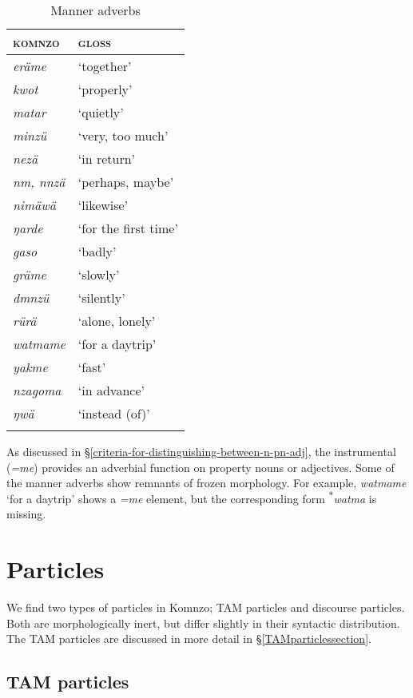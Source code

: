 \begin{table}
\caption{Manner adverbs}
\label{manner-adverbs}
	\begin{tabular}{ll}
		\lsptoprule
		\textsc{komnzo}&\textsc{gloss}\\\midrule
		\emph{eräme}&`together'\\
		\emph{kwot}&`properly'\\
		\emph{matar}&`quietly'\\
		\emph{minzü}&`very, too much'\\
		\emph{nezä}&`in return'\\
		\emph{nm, nnzä}&`perhaps, maybe'\\
		\emph{nimäwä}&`likewise'\\
		\emph{ŋarde}&`for the first time'\\
		\emph{gaso}&`badly'\\
		\emph{gräme}&`slowly'\\
		\emph{dmnzü}&`silently'\\
		\emph{rürä}&`alone, lonely'\\
		\emph{watmame}&`for a daytrip'\\
		\emph{yakme}&`fast'\\
		\emph{nzagoma}&`in advance'\\
		\emph{ŋwä}&`instead (of)'\\
		\lspbottomrule
	\end{tabular}
\end{table}%

As discussed in \S{}\ref{criteria-for-distinguishing-between-n-pn-adj}, the instrumental  (\emph{=me}) provides an adverbial function on property nouns or adjectives. Some of the manner adverbs show remnants of frozen morphology. For example, \emph{watmame} `for a daytrip' shows a \emph{=me} element, but the corresponding form \textsuperscript{$\ast$}\emph{watma} is missing.

\section{Particles} \label{particles}

We find two types of particles in Komnzo; TAM particles and discourse particles. Both are morphologically inert, but differ slightly in their syntactic distribution. The TAM particles are discussed in more detail in \S{}\ref{TAMparticlessection}.

\subsection{TAM particles} \label{tamparticles}

